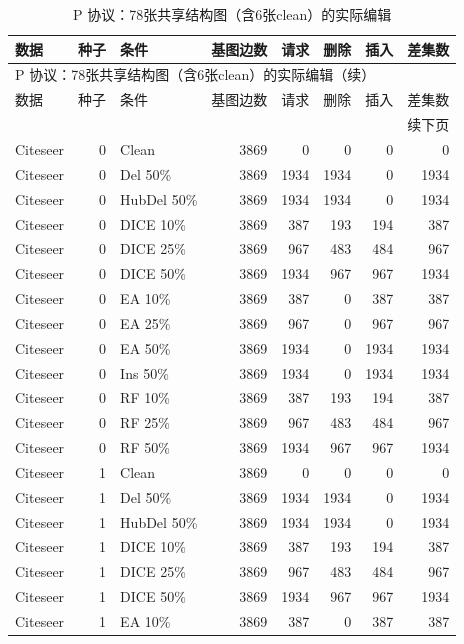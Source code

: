 {\footnotesize
\setlength{\tabcolsep}{3.2pt}
\renewcommand{\arraystretch}{1.10}
\begin{longtable}{lr l rrrrr}
\caption{P 协议：78张共享结构图（含6张clean）的实际编辑}\\
\toprule
数据 & 种子 & 条件 & 基图边数 & 请求 & 删除 & 插入 & 差集数 \\
\midrule
\endfirsthead
\multicolumn{8}{l}{P 协议：78张共享结构图（含6张clean）的实际编辑（续）}\\
\toprule
数据 & 种子 & 条件 & 基图边数 & 请求 & 删除 & 插入 & 差集数 \\
\midrule
\endhead
\midrule\multicolumn{8}{r}{续下页}\\
\endfoot
\bottomrule
\endlastfoot
Citeseer & 0 & Clean & 3869 & 0 & 0 & 0 & 0 \\
Citeseer & 0 & Del 50\% & 3869 & 1934 & 1934 & 0 & 1934 \\
Citeseer & 0 & HubDel 50\% & 3869 & 1934 & 1934 & 0 & 1934 \\
Citeseer & 0 & DICE 10\% & 3869 & 387 & 193 & 194 & 387 \\
Citeseer & 0 & DICE 25\% & 3869 & 967 & 483 & 484 & 967 \\
Citeseer & 0 & DICE 50\% & 3869 & 1934 & 967 & 967 & 1934 \\
Citeseer & 0 & EA 10\% & 3869 & 387 & 0 & 387 & 387 \\
Citeseer & 0 & EA 25\% & 3869 & 967 & 0 & 967 & 967 \\
Citeseer & 0 & EA 50\% & 3869 & 1934 & 0 & 1934 & 1934 \\
Citeseer & 0 & Ins 50\% & 3869 & 1934 & 0 & 1934 & 1934 \\
Citeseer & 0 & RF 10\% & 3869 & 387 & 193 & 194 & 387 \\
Citeseer & 0 & RF 25\% & 3869 & 967 & 483 & 484 & 967 \\
Citeseer & 0 & RF 50\% & 3869 & 1934 & 967 & 967 & 1934 \\
Citeseer & 1 & Clean & 3869 & 0 & 0 & 0 & 0 \\
Citeseer & 1 & Del 50\% & 3869 & 1934 & 1934 & 0 & 1934 \\
Citeseer & 1 & HubDel 50\% & 3869 & 1934 & 1934 & 0 & 1934 \\
Citeseer & 1 & DICE 10\% & 3869 & 387 & 193 & 194 & 387 \\
Citeseer & 1 & DICE 25\% & 3869 & 967 & 483 & 484 & 967 \\
Citeseer & 1 & DICE 50\% & 3869 & 1934 & 967 & 967 & 1934 \\
Citeseer & 1 & EA 10\% & 3869 & 387 & 0 & 387 & 387 \\

\end{longtable}}
